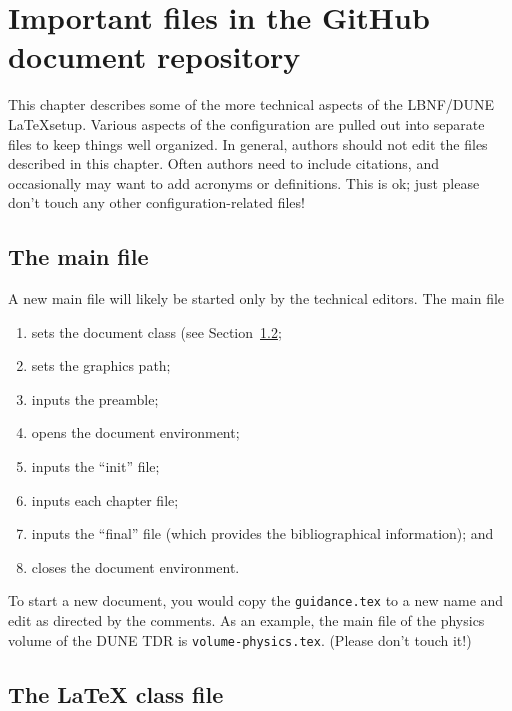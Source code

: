 \chapter{Important files in the GitHub document repository}
\label{ch:tech}

This chapter describes some of the more technical aspects of the LBNF/DUNE \LaTeX setup. Various aspects of the configuration are pulled out into separate files to keep things well organized.  In general, authors should 
not edit the files described in this chapter. Often authors need to include citations, and occasionally may want to add acronyms or definitions. This is ok; just please don't touch any other configuration-related files!

\section{The main file}
\label{sec:tech-mainfile}

A new main file will likely be started only by the technical editors. The main file

\begin{enumerate}
\item sets the document class (see Section~\ref{sec:tech-classfile};
\item sets the graphics path;
\item inputs the preamble;
\item opens the document environment;
\item inputs the ``init'' file;
\item inputs each chapter file;
\item inputs the ``final'' file (which provides the bibliographical information); and
\item closes the document environment.
\end{enumerate}

To start a new document, you would copy the \texttt{guidance.tex} to a new
name and edit as directed by the comments.  As an example, the main file of the physics volume of the DUNE TDR is \texttt{volume-physics.tex}. (Please don't touch it!) 



\section{The \LaTeX{} class file}
\label{sec:tech-classfile}

